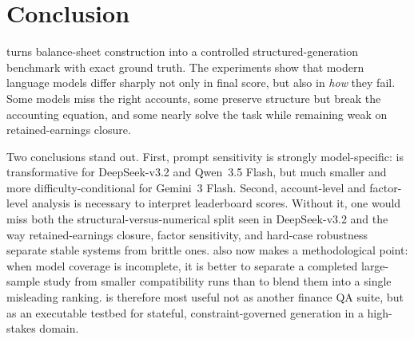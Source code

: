 \section{Conclusion}

\benchmark{} turns balance-sheet construction into a controlled
structured-generation benchmark with exact ground truth.
The experiments show that modern language models differ sharply not
only in final score, but also in \emph{how} they fail.
Some models miss the right accounts, some preserve structure but break
the accounting equation, and some nearly solve the task while remaining
weak on retained-earnings closure.

Two conclusions stand out.
First, prompt sensitivity is strongly model-specific:
\CoT{} is transformative for DeepSeek-v3.2 and Qwen~3.5 Flash, but much
smaller and more difficulty-conditional for Gemini~3 Flash.
Second, account-level and factor-level analysis is necessary to
interpret leaderboard scores.
Without it, one would miss both the structural-versus-numerical split
seen in DeepSeek-v3.2 \zs{} and the way retained-earnings closure,
factor sensitivity, and hard-case robustness separate stable systems
from brittle ones.
\benchmark{} also now makes a methodological point:
when model coverage is incomplete, it is better to separate a completed
large-sample study from smaller compatibility runs than to blend them
into a single misleading ranking.
\benchmark{} is therefore most useful not as another finance QA suite,
but as an executable testbed for stateful, constraint-governed
generation in a high-stakes domain.
